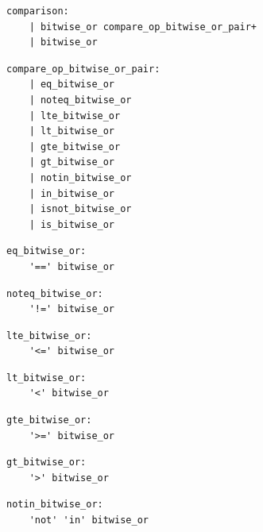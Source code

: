 \noindent\textbf{\texttt{}}\par
\begin{lstlisting}
comparison:
    | bitwise_or compare_op_bitwise_or_pair+
    | bitwise_or
\end{lstlisting}

\noindent\textbf{\texttt{}}\par
\begin{lstlisting}
compare_op_bitwise_or_pair:
    | eq_bitwise_or
    | noteq_bitwise_or
    | lte_bitwise_or
    | lt_bitwise_or
    | gte_bitwise_or
    | gt_bitwise_or
    | notin_bitwise_or
    | in_bitwise_or
    | isnot_bitwise_or
    | is_bitwise_or
\end{lstlisting}

\noindent\textbf{\texttt{}}\par
\begin{lstlisting}
eq_bitwise_or:
    '==' bitwise_or
\end{lstlisting}

\noindent\textbf{\texttt{}}\par
\begin{lstlisting}
noteq_bitwise_or:
    '!=' bitwise_or
\end{lstlisting}

\noindent\textbf{\texttt{}}\par
\begin{lstlisting}
lte_bitwise_or:
    '<=' bitwise_or
\end{lstlisting}

\noindent\textbf{\texttt{}}\par
\begin{lstlisting}
lt_bitwise_or:
    '<' bitwise_or
\end{lstlisting}

\noindent\textbf{\texttt{}}\par
\begin{lstlisting}
gte_bitwise_or:
    '>=' bitwise_or
\end{lstlisting}

\noindent\textbf{\texttt{}}\par
\begin{lstlisting}
gt_bitwise_or:
    '>' bitwise_or
\end{lstlisting}

\noindent\textbf{\texttt{}}\par
\begin{lstlisting}
notin_bitwise_or:
    'not' 'in' bitwise_or
\end{lstlisting}

